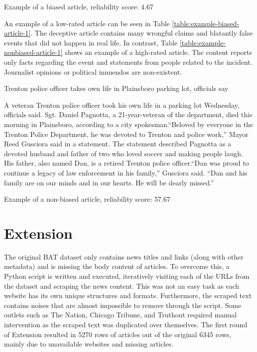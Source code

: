 \begin{table}[htbp]
\begin{minipage}{0.9\linewidth}
    \end{minipage}
    \caption{Example of a biased article, reliability score: 4.67}
    \label{table:example-biased-article-1}
\end{table}

An example of a low-rated article can be seen in Table \ref{table:example-biased-article-1}. The deceptive article contains many wrongful claims and blatantly false events that did not happen in real life. In contrast, Table \ref{table:example-nonbiased-article-1} shows an example of a high-rated article. The content reports only facts regarding the event and statements from people related to the incident. Journalist opinions or political innuendos are non-existent.


\begin{table}[htbp]
    \centering
    \begin{minipage}{0.9\linewidth}
        \begin{center}
            \small{Trenton police officer takes own life in Plainsboro parking lot, officials say}
        \end{center}
        \scriptsize{
            A veteran Trenton police officer took his own life in a parking lot Wednesday, officials said. Sgt. Daniel Pagnotta, a 21-year-veteran of the department, died this morning in Plainsboro, according to a city spokesman.“Beloved by everyone in the Trenton Police Department, he was devoted to Trenton and police work,” Mayor Reed Gusciora said in a statement. The statement described Pagnotta as a devoted husband and father of two who loved soccer and making people laugh. His father, also named Dan, is a retired Trenton police officer.“Dan was proud to continue a legacy of law enforcement in his family,” Gusciora said. “Dan and his family are on our minds and in our hearts. He will be dearly missed.”}
    \end{minipage}
    \caption{Example of a non-biased article, reliability score: 57.67}
    \label{table:example-nonbiased-article-1}
\end{table}

\section{Extension}

The original BAT dataset only contains news titles and links (along with other metadata) and is missing the body content of articles. To overcome this, a Python script is written and executed, iteratively visiting each of the URLs from the dataset and scraping the news content. This was not an easy task as each website has its own unique structures and formats. Furthermore, the scraped text contains noises that are almost impossible to remove through the script. Some outlets such as The Nation, Chicago Tribune, and Truthout required manual intervention as the scraped text was duplicated over themselves. The first round of Extension resulted in 5270 rows of articles out of the original 6345 rows, mainly due to unavailable websites and missing articles.


